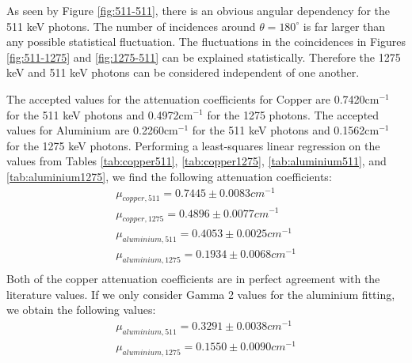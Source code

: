 \documentclass[10pt]{IEEEtran}
\begin{document}
As seen by Figure \ref{fig:511-511}, there is an obvious angular dependency for the 511 keV photons. The number of incidences around $\theta=180^\circ$ is far larger than any possible statistical fluctuation. The fluctuations in the coincidences in Figures \ref{fig:511-1275} and \ref{fig:1275-511} can be explained statistically. Therefore the 1275 keV and 511 keV photons can be considered independent of one another.

The accepted values for the attenuation coefficients for Copper are 0.7420cm$^{-1}$ for the 511 keV photons and 0.4972cm$^{-1}$ for the 1275 photons. The accepted values for Aluminium are 0.2260cm$^{-1}$ for the 511 keV photons and 0.1562cm$^{-1}$ for the 1275 keV photons\cite{nist}. Performing a least-squares linear regression on the values from Tables \ref{tab:copper511}, \ref{tab:copper1275}, \ref{tab:aluminium511}, and \ref{tab:aluminium1275}, we find the following attenuation coefficients:
\begin{eqnarray*}
\mu_{copper,511} = 0.7445\pm 0.0083cm^{-1}\\
\mu_{copper,1275} = 0.4896\pm 0.0077cm^{-1} \\
\mu_{aluminium,511} = 0.4053\pm 0.0025cm^{-1} \\
\mu_{aluminium,1275} = 0.1934\pm 0.0068cm^{-1} \\
\end{eqnarray*}
Both of the copper attenuation coefficients are in perfect agreement with the literature values. If we only consider Gamma 2 values for the aluminium fitting, we obtain the following values:
\begin{eqnarray*}
\mu_{aluminium,511} = 0.3291\pm 0.0038cm^{-1} \\
\mu_{aluminium,1275} = 0.1550\pm 0.0090cm^{-1} \\
\end{eqnarray*}
\end{document}
